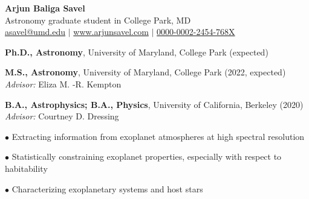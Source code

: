 \documentclass[12pt,letterpaper]{article}
\begin{document}
\thispagestyle{empty}\sloppy\sloppypar\raggedbottom
\centering
\textbf{\Large Arjun Baliga Savel} \hfill \\
\textsf{Astronomy graduate student in College Park, MD} \\
\textsf{\small \href{href="mailto:asavel@umd.edu"}{asavel@umd.edu} $|$ \href{www.arjunsavel.com}{www.arjunsavel.com} $|$ \href{https://orcid.org/0000-0002-2454-768X/}{0000-0002-2454-768X}}\\
\raggedright

\begin{list}{}{\cvlist}
\item
\textbf{Ph.D., Astronomy}, University of Maryland, College Park (expected)
\item
\textbf{M.S., Astronomy}, University of Maryland, College Park (2022, expected)
\\\textit{Advisor:} Eliza M. -R. Kempton
\item
\textbf{B.A., Astrophysics; B.A., Physics}, University of California, Berkeley (2020) \\\textit{Advisor:} Courtney D. Dressing
\end{list}

\begin{list}{}{\cvlist}

\item $\bullet$ Extracting information from exoplanet atmospheres at high spectral resolution
\item $\bullet$ Statistically constraining exoplanet properties, especially with respect to habitability
\item $\bullet$ Characterizing exoplanetary systems and host stars

\end{list}


  

  \begin{list}{}{\cvlist}
    
  \end{list}

  \begin{list}{}{\cvlist}
    
  \end{list}
\end{document}
